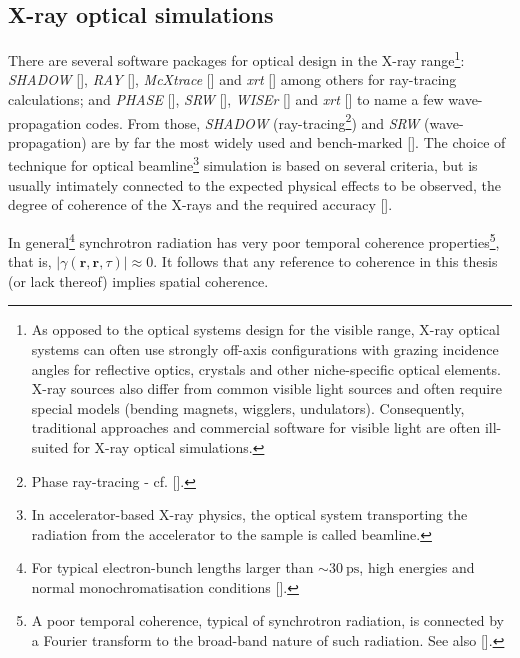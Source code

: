 \begin{refsection}
\section{X-ray optical simulations}\label{sec:optical_simulations}

There are several software packages for optical design in the X-ray range\footnote{As opposed to the optical systems design for the visible range, X-ray optical systems can often use strongly off-axis configurations with grazing incidence angles for reflective optics, crystals and other niche-specific optical elements. X-ray sources also differ from common visible light sources and often require special models (bending magnets, wigglers, undulators). Consequently, traditional approaches and commercial software for visible light are often ill-suited for X-ray optical simulations.}: \textit{SHADOW} [\cite{Cerrina1984}], \textit{RAY} [\cite{Schafers2008}], \textit{McXtrace} [\cite{BergbackKnudsen2013}] and \textit{xrt} [\cite{Klementiev2014}] among others for ray-tracing calculations; and \textit{PHASE} [\cite{Bahrdt1997}], \textit{SRW} [\cite{Chubar1998}], \textit{WISEr} [\cite{Raimondi2010}] and \textit{xrt} [\cite{Chernikov2017}] to name a few wave-propagation codes. From those, \textit{SHADOW} (ray-tracing\footnote{Phase ray-tracing - cf. [\cite{Lee2007,SanchezdelRio2011}].}) and \textit{SRW} (wave-propagation) are by far the most widely used and bench-marked [\cite{Rio2013,Chubar2014}]. The choice of technique for optical beamline\footnote{In accelerator-based X-ray physics, the optical system transporting the radiation from the accelerator to the sample is called beamline.} simulation is based on several criteria, but is usually intimately connected to the expected physical effects to be observed, the degree of coherence of the X-rays and the required accuracy [\cite{SanchezdelRio2019}].

In general\footnote{For typical electron-bunch lengths larger than $\sim30~\text{ps}$, high energies and normal monochromatisation conditions [\cite{Geloni2008}].} synchrotron radiation has very poor temporal coherence properties\footnote{A poor temporal coherence, typical of synchrotron radiation, is connected by a Fourier transform to the broad-band nature of such radiation. See also [\cite[\textit{§4.4.3}]{Mandel1995}].}, that is, $|\gamma(\textbf{r},\textbf{r},\tau)|\approx0$. It follows that any reference to coherence in this thesis (or lack thereof) implies spatial coherence.


\end{refsection}
